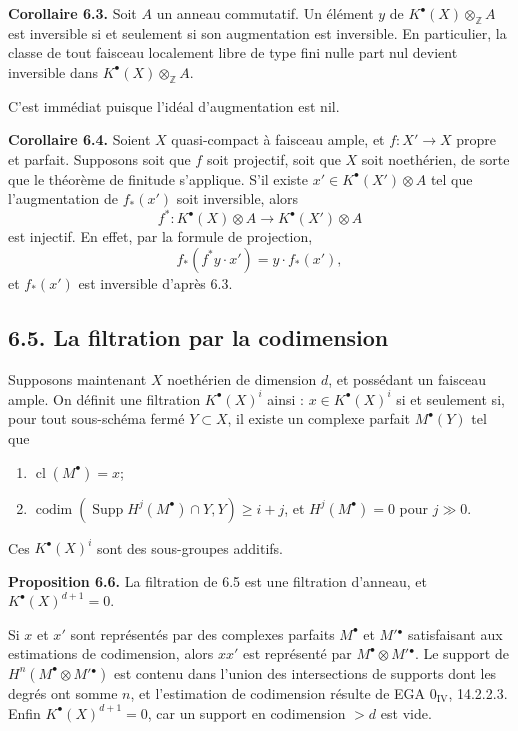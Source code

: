 \documentclass[11pt]{article}
\newcommand{\cl}{\operatorname{cl}}
\providecommand{\codim}{\operatorname{codim}}
\providecommand{\Supp}{\operatorname{Supp}}
\providecommand{\codim}{\operatorname{codim}}
\begin{document}
\textbf{Corollaire 6.3.} Soit \(A\) un anneau commutatif. Un élément \(y\) de \(K^\bullet(X)\otimes_{\mathbb Z}A\) est inversible si et seulement si son augmentation est inversible. En particulier, la classe de tout faisceau localement libre de type fini nulle part nul devient inversible dans \(K^\bullet(X)\otimes_{\mathbb Z}A\).

C'est immédiat puisque l'idéal d'augmentation est nil.

\textbf{Corollaire 6.4.} Soient \(X\) quasi-compact à faisceau ample, et \(f:X'\to X\) propre et parfait. Supposons soit que \(f\) soit projectif, soit que \(X\) soit noethérien, de sorte que le théorème de finitude s'applique. S'il existe \(x'\in K^\bullet(X')\otimes A\) tel que l'augmentation de \(f_*(x')\) soit inversible, alors
\[
  f^*:K^\bullet(X)\otimes A\longrightarrow K^\bullet(X')\otimes A
\]
est injectif.
En effet, par la formule de projection,
\[
  f_*(f^*y\cdot x')=y\cdot f_*(x'),
\]
et \(f_*(x')\) est inversible d'après 6.3.

\subsection*{6.5. La filtration par la codimension}
Supposons maintenant \(X\) noethérien de dimension \(d\), et possédant un faisceau ample. On définit une filtration \(K^\bullet(X)^i\) ainsi : \(x\in K^\bullet(X)^i\) si et seulement si, pour tout sous-schéma fermé \(Y\subset X\), il existe un complexe parfait \(M^\bullet(Y)\) tel que
\begin{enumerate}[label=\textup{\alph*)}]
\item \(\cl(M^\bullet)=x\);
\item \(\codim(\Supp H^j(M^\bullet)\cap Y,Y)\ge i+j\), et \(H^j(M^\bullet)=0\) pour \(j\gg0\).
\end{enumerate}
Ces \(K^\bullet(X)^i\) sont des sous-groupes additifs.

\textbf{Proposition 6.6.} La filtration de 6.5 est une filtration d'anneau, et \(K^\bullet(X)^{d+1}=0\).

Si \(x\) et \(x'\) sont représentés par des complexes parfaits \(M^\bullet\) et \(M'{}^\bullet\) satisfaisant aux estimations de codimension, alors \(xx'\) est représenté par \(M^\bullet\otimes M'{}^\bullet\). Le support de \(H^n(M^\bullet\otimes M'{}^\bullet)\) est contenu dans l'union des intersections de supports dont les degrés ont somme \(n\), et l'estimation de codimension résulte de EGA \(0_{\mathrm{IV}}\), 14.2.2.3. Enfin \(K^\bullet(X)^{d+1}=0\), car un support en codimension \(>d\) est vide.
\end{document}
